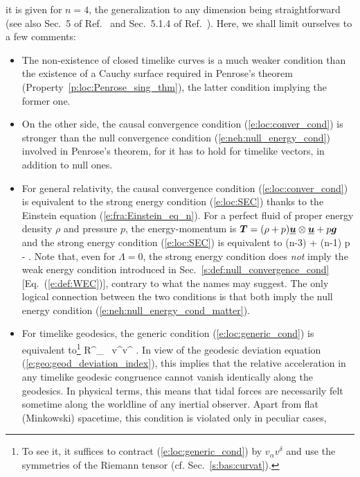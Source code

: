 it is given for $n=4$, the generalization to any dimension being
straightforward (see also Sec.~5 of Ref.~\cite{Senov98} and Sec.~5.1.4 of Ref.~\cite{SenovG15}).
Here, we shall limit ourselves to a few comments:
\begin{itemize}
\item The non-existence of closed timelike curves is a much weaker condition
than the existence of a Cauchy surface required in Penrose's theorem
(Property~\ref{p:loc:Penrose_sing_thm}), the latter condition implying the former one.
\item On the other side, the causal convergence condition (\ref{e:loc:conver_cond}) is stronger
than the null convergence condition (\ref{e:neh:null_energy_cond}) involved
in Penrose's theorem, for
it has to hold for timelike vectors, in addition to null ones.
\item For general relativity,
the causal convergence condition (\ref{e:loc:conver_cond}) is equivalent to
the strong energy condition (\ref{e:loc:SEC}) thanks to the
Einstein equation (\ref{e:fra:Einstein_eq_n}).
For a perfect fluid of proper energy density $\rho$ and pressure $p$,
the energy-momentum is
$\bm{T} = (\rho + p) \underline{\bm{u}}\otimes\underline{\bm{u}} + p \bm{g}$ and the strong energy condition
(\ref{e:loc:SEC}) is equivalent to
\be \label{e:loc:SEC_fluid}
    (n-3) \rho + (n-1) p - \frac{\Lambda}{4\pi}  .
\ee
Note that, even for $\Lambda=0$, the strong energy condition does \emph{not} imply the
weak energy condition
introduced in Sec.~\ref{s:def:null_convergence_cond} [Eq.~(\ref{e:def:WEC})],
contrary to what the names may suggest. The only logical connection between
the two conditions is that both imply the null energy condition (\ref{e:neh:null_energy_cond_matter}).
\item For timelike geodesics, the generic condition (\ref{e:loc:generic_cond})
is equivalent to\footnote{To see it, it suffices to contract (\ref{e:loc:generic_cond}) by
$v_\alpha v^\delta$ and use the symmetries of the Riemann tensor (cf. Sec.~\ref{s:bas:curvat}).}
\be \label{e:loc:gen_cond_timelike}
    R^\alpha_{\ \; \mu\nu\beta} v^\mu v^\nu {} .
\ee
In view of the geodesic deviation equation
(\ref{e:geo:geod_deviation_index}), this implies that the relative acceleration in any timelike
geodesic congruence cannot vanish identically along the geodesics. In physical terms, this means
that tidal forces are necessarily felt sometime along the worldline of any inertial observer. Apart from flat (Minkowski) spacetime, this condition is violated only in peculiar cases,

\end{itemize}
